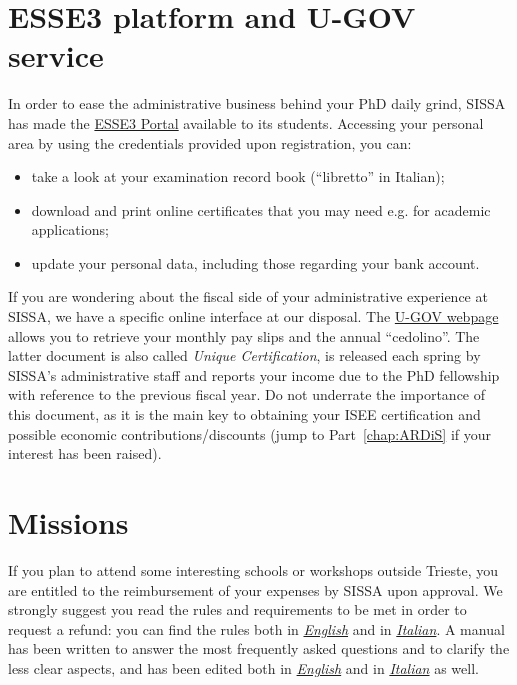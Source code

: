 \documentclass{sissavademecum}
\begin{document}
\section{ESSE3 platform and U-GOV service}

In order to ease the administrative business behind your PhD daily grind, SISSA has made the \href{https://sissa.esse3.cineca.it/Home.do}{ESSE3 Portal} available to its students. Accessing your personal area by using the credentials provided upon registration, you can:
\begin{itemize}
    \item take a look at your examination record book (``libretto'' in Italian);
    \item download and print online certificates that you may need e.g. for academic applications;
    \item update your personal data, including those regarding your bank account.
\end{itemize}
If you are wondering about the fiscal side of your administrative experience at SISSA, we have a specific online interface at our disposal. The \href{http://go.sissa.it/cedolini}{U-GOV webpage} allows you to retrieve your monthly pay slips and the annual ``cedolino''. The latter document is also called \textit{Unique Certification}, is released each spring by SISSA's administrative staff and reports your income due to the PhD fellowship with reference to the previous fiscal year. Do not underrate the importance of this document, as it is the main key to obtaining your ISEE certification and possible economic contributions/discounts (jump to Part~\ref{chap:ARDiS} if your interest has been raised).


\section{Missions}

If you plan to attend some interesting schools or workshops outside Trieste, you are entitled to the reimbursement of your expenses by SISSA upon approval. We strongly suggest you read the rules and requirements to be met in order to request a refund: you can find the rules both in \href{https://services.sissa.it/mission/doc/English/ENGLISH_VERSION_REGOLAMENTO_MISSIONI.pdf}{\emph{English}} and in \href{https://services.sissa.it/mission/doc/Italian/2019_REGOLAMENTO_MISSIONI.pdf}{\emph{Italian}}. A manual has been written to answer the most frequently asked questions and to clarify the less clear aspects, and has been edited both in \href{https://services.sissa.it/mission/doc/English/ENGLISH_VERSION_USERS_GUIDE_C_i__PhD.pdf}{\emph{English}} and in \href{https://services.sissa.it/mission/doc/Italian/MANUALE_C_(i)__PHD.pdf}{\emph{Italian}} as well.
\end{document}
